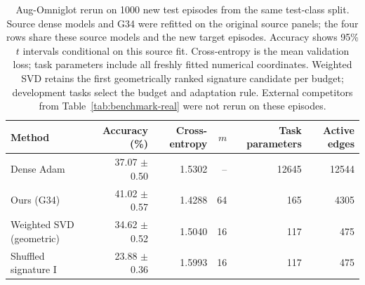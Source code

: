\begin{table}[htbp]
\centering\small
\caption{Aug-Omniglot rerun on 1000 new test episodes from the same
    test-class split. Source dense models and G34 were refitted on the
    original source panels; the four rows share these source models and
    the new target episodes. Accuracy shows 95\% $t$ intervals conditional
    on this source fit. Cross-entropy is the mean validation loss; task
    parameters include all freshly fitted numerical coordinates.
    Weighted SVD retains the first geometrically ranked signature
    candidate per budget; development tasks select the budget and
    adaptation rule. External competitors from
    Table~\ref{tab:benchmark-real} were not rerun on these episodes.}
\label{tab:omniglot-signature}
\begin{tabular}{lrrrrr}
\toprule
Method & Accuracy (\%) & Cross-entropy & $m$ & Task parameters & Active edges\\
\midrule
Dense Adam & 37.07 $\pm$ 0.50 & 1.5302 & -- & 12645 & 12544\\
Ours (G34) & 41.02 $\pm$ 0.57 & 1.4288 & 64 & 165 & 4305\\
Weighted SVD (geometric) & 34.62 $\pm$ 0.52 & 1.5040 & 16 & 117 & 475\\
Shuffled signature I & 23.88 $\pm$ 0.36 & 1.5993 & 16 & 117 & 475\\
\bottomrule
\end{tabular}
\end{table}
